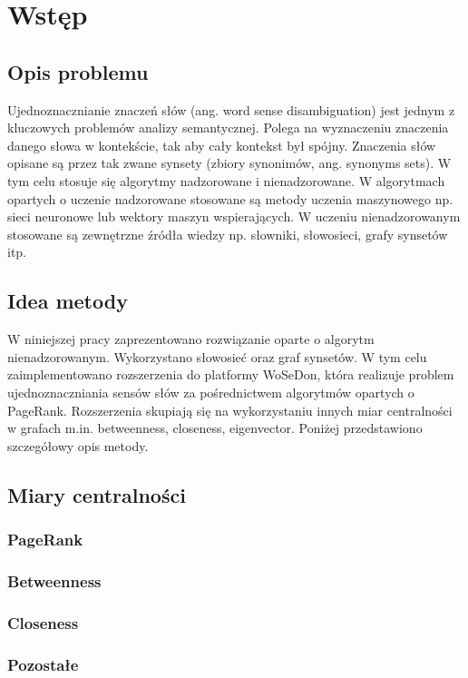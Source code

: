 \chapter{Wstęp}
\section{Opis problemu}
Ujednoznacznianie znaczeń słów (ang. word sense disambiguation) jest jednym z kluczowych problemów analizy semantycznej. Polega na wyznaczeniu znaczenia danego słowa w kontekście, tak aby cały kontekst był spójny. Znaczenia słów opisane są przez tak zwane synsety (zbiory synonimów, ang. synonyms sets). W tym celu stosuje się algorytmy nadzorowane i nienadzorowane. W algorytmach opartych o uczenie nadzorowane stosowane są metody uczenia maszynowego np. sieci neuronowe lub wektory maszyn wspierających. W uczeniu nienadzorowanym stosowane są zewnętrzne źródła wiedzy np. słowniki, słowosieci, grafy synsetów itp. 

\section{Idea metody}
W niniejszej pracy zaprezentowano rozwiązanie oparte o algorytm nienadzorowanym. Wykorzystano słowosieć oraz graf synsetów. W tym celu zaimplementowano rozszerzenia do platformy WoSeDon, która realizuje problem ujednoznaczniania sensów słów za pośrednictwem algorytmów opartych o PageRank. Rozszerzenia skupiają się na wykorzystaniu innych miar centralności w grafach m.in. betweenness, closeness, eigenvector. Poniżej przedstawiono szczegółowy opis metody.

\section{Miary centralności}
\subsection{PageRank}
\subsection{Betweenness}
\subsection{Closeness}
\subsection{Pozostałe}